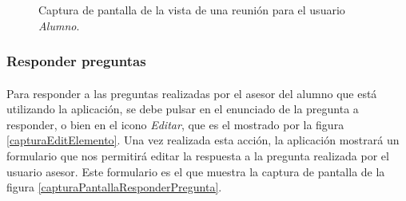   \begin{figure}[!ht]
    \begin{center}
      \caption{Captura de pantalla de la vista de una reunión para el usuario \textit{Alumno}.}
      \label{capturaPantallaVerReunion}
    \end{center}
  \end{figure}

  \subsubsection{Responder preguntas}

  \paragraph{}Para responder a las preguntas realizadas por el asesor del alumno
  que está utilizando la aplicación, se debe pulsar en el enunciado de la
  pregunta a responder, o bien en el icono \textit{Editar}, que es el mostrado
  por la figura \ref{capturaEditElemento}. Una vez realizada esta acción, la
  aplicación mostrará un formulario que nos permitirá editar la respuesta a la
  pregunta realizada por el usuario asesor. Este formulario es el que muestra
  la captura de pantalla de la figura \ref{capturaPantallaResponderPregunta}.

